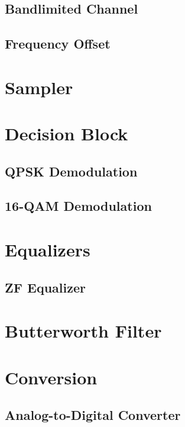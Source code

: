 \documentclass[]{article}
\begin{document}
\subsection{Bandlimited Channel}
\label{app:bandlimited}


\subsection{Frequency Offset}
\label{app:freq}


\section{Sampler}
\label{app:sampler}


\section{Decision Block}
\label{app:dblocks}
\subsection{QPSK Demodulation}
\label{app:qpsk_demod}


\subsection{16-QAM Demodulation}
\label{app:16qam_demod}


\section{Equalizers}
\subsection{ZF Equalizer}



\section{Butterworth Filter}
\label{app:butterworth}


\section{Conversion}
\label{app:convert}
\subsection{Analog-to-Digital Converter}
\label{app:ad}

\end{document}

